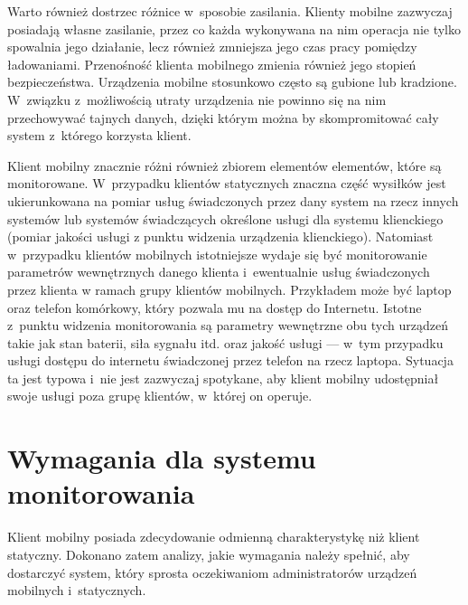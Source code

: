 Warto również dostrzec różnice w~sposobie zasilania. Klienty mobilne
zazwyczaj posiadają własne zasilanie, przez co każda wykonywana na nim
operacja nie tylko spowalnia jego działanie, lecz również zmniejsza
jego czas pracy pomiędzy ładowaniami. Przenośność klienta mobilnego
zmienia również jego stopień bezpieczeństwa. Urządzenia mobilne
stosunkowo często są gubione lub kradzione. W~związku z~możliwością
utraty urządzenia nie powinno się na nim przechowywać tajnych danych,
dzięki którym można by skompromitować cały system z~którego korzysta
klient.

Klient mobilny znacznie różni również zbiorem elementów elementów,
które są monitorowane. W~przypadku klientów statycznych znaczna część
wysiłków jest ukierunkowana na pomiar usług świadczonych przez dany
system na rzecz innych systemów lub systemów świadczących określone
usługi dla systemu klienckiego (pomiar jakości usługi z punktu
widzenia urządzenia klienckiego). Natomiast w~przypadku klientów
mobilnych istotniejsze wydaje się być monitorowanie parametrów
wewnętrznych danego klienta i~ewentualnie usług świadczonych przez
klienta w ramach grupy klientów mobilnych. Przykładem może być laptop
oraz telefon komórkowy, który pozwala mu na dostęp do
Internetu. Istotne z~punktu widzenia monitorowania są parametry
wewnętrzne obu tych urządzeń takie jak stan baterii, siła sygnału
itd. oraz jakość usługi --- w~tym przypadku usługi dostępu do
internetu świadczonej przez telefon na rzecz laptopa. Sytuacja ta jest
typowa i~nie jest zazwyczaj spotykane, aby klient mobilny udostępniał
swoje usługi poza grupę klientów, w~której on operuje.

\section[Wymagania][Wymagania dla systemu monitorowania]{Wymagania dla systemu monitorowania}

Klient mobilny posiada zdecydowanie odmienną charakterystykę niż
klient statyczny. Dokonano zatem analizy, jakie wymagania należy
spełnić, aby dostarczyć system, który sprosta oczekiwaniom
administratorów urządzeń mobilnych i~statycznych.

